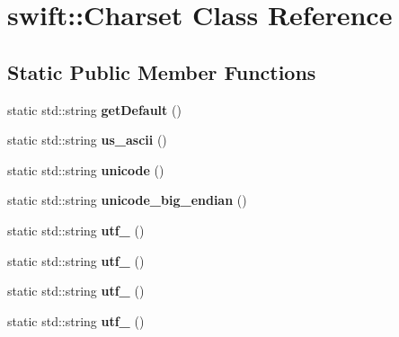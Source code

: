 \hypertarget{classswift_1_1_charset}{\section{swift\-:\-:Charset Class Reference}
\label{classswift_1_1_charset}
}
\subsection*{Static Public Member Functions}
\begin{DoxyCompactItemize}
\item 
\hypertarget{classswift_1_1_charset_a23f99c4d93167762e71af40247ed1e55}{static std\-::string {\bfseries get\-Default} ()}\label{classswift_1_1_charset_a23f99c4d93167762e71af40247ed1e55}

\item 
\hypertarget{classswift_1_1_charset_a30aaac032482320fbbb60a3693f29fc2}{static std\-::string {\bfseries us\-\_\-ascii} ()}\label{classswift_1_1_charset_a30aaac032482320fbbb60a3693f29fc2}

\item 
\hypertarget{classswift_1_1_charset_a165473caec9f1b53669f6f0b8b04311a}{static std\-::string {\bfseries unicode} ()}\label{classswift_1_1_charset_a165473caec9f1b53669f6f0b8b04311a}

\item 
\hypertarget{classswift_1_1_charset_abd25d1961826c41f61f4524613251210}{static std\-::string {\bfseries unicode\-\_\-big\-\_\-endian} ()}\label{classswift_1_1_charset_abd25d1961826c41f61f4524613251210}

\item 
\hypertarget{classswift_1_1_charset_aa969ad44a57ab6ce485a4bfb017e3898}{static std\-::string {\bfseries utf\-\_} ()}\label{classswift_1_1_charset_aa969ad44a57ab6ce485a4bfb017e3898}

\item 
\hypertarget{classswift_1_1_charset_ac0fbfcb79cb75117a4b80957da3d717e}{static std\-::string {\bfseries utf\-\_} ()}\label{classswift_1_1_charset_ac0fbfcb79cb75117a4b80957da3d717e}

\item 
\hypertarget{classswift_1_1_charset_a39278c2edadc2d203c4b763462cd1b8f}{static std\-::string {\bfseries utf\-\_} ()}\label{classswift_1_1_charset_a39278c2edadc2d203c4b763462cd1b8f}

\item 
\hypertarget{classswift_1_1_charset_a473d80276af612da7047579a6e8377f6}{static std\-::string {\bfseries utf\-\_} ()}\label{classswift_1_1_charset_a473d80276af612da7047579a6e8377f6}


\end{DoxyCompactItemize}
